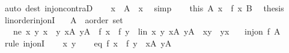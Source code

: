 \begin{isabellebody}
\ {\isacharparenleft}{\kern0pt}auto\ dest{\isacharcolon}{\kern0pt}\ inj{\isacharunderscore}{\kern0pt}on{\isacharunderscore}{\kern0pt}contraD{\isacharparenright}{\kern0pt}\isanewline
\ \ \isamarkupfalse%
\ {\isachardoublequoteopen}x{\isacharprime}{\kern0pt}\ {\isasymnotin}\ A\ {\isacharminus}{\kern0pt}\ {\isacharbraceleft}{\kern0pt}x{\isacharprime}{\kern0pt}{\isacharbraceright}{\kern0pt}{\isachardoublequoteclose}\ \isamarkupfalse%
\ simp\isanewline
\ \ \isamarkupfalse%
\ this\ A\ {\isacartoucheopen}x\ {\isacharequal}{\kern0pt}\ f\ x{\isacharprime}{\kern0pt}{\isacartoucheclose}\ B\ \isamarkupfalse%
\ {\isacharquery}{\kern0pt}thesis\ \isacommand{{\isachardot}{\kern0pt}{\isachardot}{\kern0pt}}\isamarkupfalse%
\isanewline
{}\isamarkupfalse%
%
\endisatagproof
{\isafoldproof}%
%
\isadelimproof
\isanewline
%
\endisadelimproof
\isanewline
{}\isamarkupfalse%
\ linorder{\isacharunderscore}{\kern0pt}inj{\isacharunderscore}{\kern0pt}onI{\isacharcolon}{\kern0pt}\isanewline
\ \ \ A\ {\isacharcolon}{\kern0pt}{\isacharcolon}{\kern0pt}\ {\isachardoublequoteopen}{\isacharprime}{\kern0pt}a{\isacharcolon}{\kern0pt}{\isacharcolon}{\kern0pt}order\ set{\isachardoublequoteclose}\isanewline
\ \ \ ne{\isacharcolon}{\kern0pt}\ {\isachardoublequoteopen}{\isasymAnd}x\ y{\isachardot}{\kern0pt}\ {\isasymlbrakk}x\ {\isacharless}{\kern0pt}\ y{\isacharsemicolon}{\kern0pt}\ x{\isasymin}A{\isacharsemicolon}{\kern0pt}\ y{\isasymin}A{\isasymrbrakk}\ {\isasymLongrightarrow}\ f\ x\ {\isasymnoteq}\ f\ y{\isachardoublequoteclose}\ \ lin{\isacharcolon}{\kern0pt}\ {\isachardoublequoteopen}{\isasymAnd}x\ y{\isachardot}{\kern0pt}\ {\isasymlbrakk}x{\isasymin}A{\isacharsemicolon}{\kern0pt}\ y{\isasymin}A{\isasymrbrakk}\ {\isasymLongrightarrow}\ x{\isasymle}y\ {\isasymor}\ y{\isasymle}x{\isachardoublequoteclose}\isanewline
\ \ \ {\isachardoublequoteopen}inj{\isacharunderscore}{\kern0pt}on\ f\ A{\isachardoublequoteclose}\isanewline
%
\isadelimproof
%
\endisadelimproof
%
\isatagproof
{}\isamarkupfalse%
\ {\isacharparenleft}{\kern0pt}rule\ inj{\isacharunderscore}{\kern0pt}onI{\isacharparenright}{\kern0pt}\isanewline
\ \ \isamarkupfalse%
\ x\ y\isanewline
\ \ \isamarkupfalse%
\ eq{\isacharcolon}{\kern0pt}\ {\isachardoublequoteopen}f\ x\ {\isacharequal}{\kern0pt}\ f\ y{\isachardoublequoteclose}\ \ {\isachardoublequoteopen}x{\isasymin}A{\isachardoublequoteclose}\ {\isachardoublequoteopen}y{\isasymin}A{\isachardoublequoteclose}\isanewline

\end{isabellebody}
